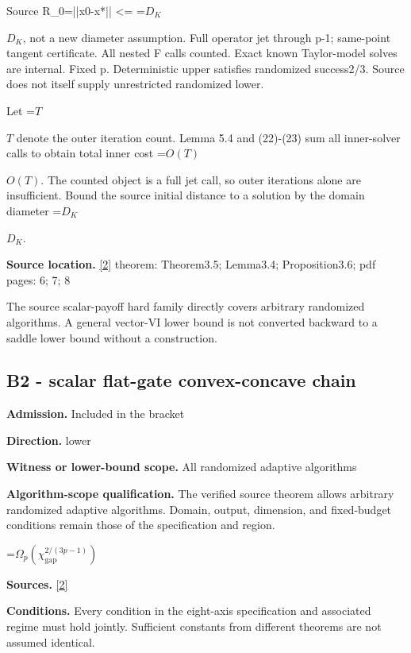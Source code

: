 \documentclass[10pt,a4paper]{article}
\newcommand{\AtlasMath}[1]{\par\begingroup\centering\setbox0=\hbox{$\displaystyle #1$}\ifdim\wd0>1.4\linewidth\typeout{ATLAS WIDE FORMULA: \the\wd0}\fi\ifdim\wd0>\linewidth\resizebox{\linewidth}{!}{\box0}\else\box0\fi\par\endgroup}
\newcommand{\AtlasInlineMath}[1]{\begingroup\setbox0=\hbox{$#1$}\ifdim\wd0>.4\linewidth\endgroup\AtlasMath{#1}\else\endgroup$#1$\fi}
\begin{document}
Source R\_0=||x0-x*|| <= \AtlasInlineMath{D_K}, not a new diameter assumption. Full operator jet through p-1; same-point tangent certificate. All nested F calls counted. Exact known Taylor-model solves are internal. Fixed p. Deterministic upper satisfies randomized success2/3. Source does not itself supply unrestricted randomized lower.



Let \AtlasInlineMath{T} denote the outer iteration count. Lemma 5.4 and (22)-(23) sum all inner-solver calls to obtain total inner cost \AtlasInlineMath{O(T)}. The counted object is a full jet call, so outer iterations alone are insufficient. Bound the source initial distance to a solution by the domain diameter \AtlasInlineMath{D_K}.



\textbf{Source location.} \href{https://arxiv.org/pdf/2609.28246v2}{[2]} theorem: Theorem3.5; Lemma3.4; Proposition3.6; pdf pages: 6; 7; 8



The source scalar-payoff hard family directly covers arbitrary randomized algorithms. A general vector-VI lower bound is not converted backward to a saddle lower bound without a construction.



\subsection{B2 - scalar flat-gate convex-concave chain}


\textbf{Admission.} Included in the bracket



\textbf{Direction.} lower



\textbf{Witness or lower-bound scope.} All randomized adaptive algorithms



\textbf{Algorithm-scope qualification.} The verified source theorem allows arbitrary randomized adaptive algorithms. Domain, output, dimension, and fixed-budget conditions remain those of the specification and region.



\AtlasMath{\Omega_p(\chi_{\mathrm{gap}}^{2/(3p-1)})}


\textbf{Sources.} \href{https://arxiv.org/pdf/2609.28246v2}{[2]}



\textbf{Conditions.} Every condition in the eight-axis specification and associated regime must hold jointly. Sufficient constants from different theorems are not assumed identical.
\end{document}
